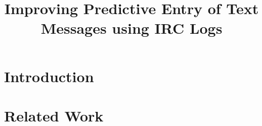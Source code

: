 \documentclass[conference]{IEEEtran}
\begin{document}
\title{Improving Predictive Entry of Text Messages using IRC Logs}


\author{
\IEEEauthorblockA{\ldots\\
\ldots\\
\ldots\\
\ldots}
\and
\IEEEauthorblockA{\ldots\\
\ldots\\
\ldots\\
\ldots}
\and
\IEEEauthorblockA{\ldots\\
\ldots\\
\ldots\\
\ldots}
}

\maketitle

\begin{abstract}

\end{abstract}

\section{Introduction}


\section{Related Work}
\end{document}
